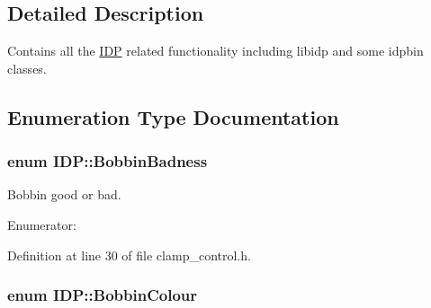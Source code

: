 \subsection{Detailed Description}
Contains all the \hyperlink{namespaceIDP}{IDP} related functionality including libidp and some idpbin classes. 

\subsection{Enumeration Type Documentation}
\hypertarget{namespaceIDP_adf12b2c1e1c228810b18c34a3c88c32d}{
\subsubsection[{BobbinBadness}]{\setlength{\rightskip}{0pt plus 5cm}enum {\bf IDP::BobbinBadness}}}
\label{namespaceIDP_adf12b2c1e1c228810b18c34a3c88c32d}


Bobbin good or bad. 

\begin{Desc}
\item[Enumerator: ]\par
\begin{description}
\item[{\em 
\hypertarget{namespaceIDP_adf12b2c1e1c228810b18c34a3c88c32dafdc1b8b5a9d849fd99ac2ae438b632dd}{
BOBBIN\_\-GOOD}
\label{namespaceIDP_adf12b2c1e1c228810b18c34a3c88c32dafdc1b8b5a9d849fd99ac2ae438b632dd}
}]\item[{\em 
\hypertarget{namespaceIDP_adf12b2c1e1c228810b18c34a3c88c32da6cb4993a316e9d4dc9836d3d990fd0f6}{
BOBBIN\_\-BAD}
\label{namespaceIDP_adf12b2c1e1c228810b18c34a3c88c32da6cb4993a316e9d4dc9836d3d990fd0f6}
}]\end{description}
\end{Desc}



Definition at line 30 of file clamp\_\-control.h.

\hypertarget{namespaceIDP_a6efd2cca14c0dae1c6458714ce0218df}{
\subsubsection[{BobbinColour}]{\setlength{\rightskip}{0pt plus 5cm}enum {\bf IDP::BobbinColour}}}
\label{namespaceIDP_a6efd2cca14c0dae1c6458714ce0218df}


